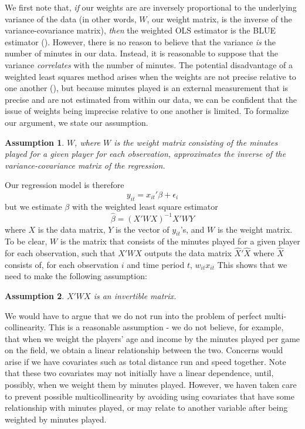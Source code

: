 \documentclass[12pt]{article}
\newtheorem{assumption}{Assumption}
\begin{document}
	We first note that, \emph{if} our weights are are inversely proportional to the underlying variance of the data (in other words, $W$, our weight matrix, is the inverse of the variance-covariance matrix), \emph{then} the weighted OLS estimator is the BLUE estimator (\cite{aitken_iv.least_1936}). However, there is no reason to believe that the variance \emph{is} the number of minutes in our data. Instead, it is reasonable to suppose that the variance \emph{correlates} with the number of minutes. The potential disadvantage of a weighted least squares method arises when the weights are not precise relative to one another (\cite{carroll_transformation_1988}), but because minutes played is an external measurement that is precise and are not estimated from within our data, we can be confident that the issue of weights being imprecise relative to one another is limited. To formalize our argument, we state our assumption.
	
	\begin{assumption}
		$W$, where $W$ is the weight matrix consisting of the minutes played for a given player for each observation, approximates the inverse of the variance-covariance matrix of the regression.
	\end{assumption}
	
	Our regression model is therefore \[
	y_{it} = x_{it}'\beta + \epsilon_i
	\] but we estimate $\beta$ with the weighted least square estimator \[
	\hat{\beta} = \left(X'WX\right)^{-1}X'WY
	\] where $X$ is the data matrix, $Y$ is the vector of $y_{it}$'s, and $W$ is the weight matrix. To be clear, $W$ is the matrix that consists of the minutes played for a given player for each observation, such that $X'WX$ outputs the data matrix $\hat{X}'\hat{X}$ where $\hat{X}$ consists of, for each observation $i$ and time period $t$, $w_{it}x_{it}$ This shows that we need to make the following assumption:
	
	\begin{assumption}
		$X'WX$ is an invertible matrix.
	\end{assumption}
	
	We would have to argue that we do not run into the problem of perfect multi-collinearity. This is a reasonable assumption - we do not believe, for example, that when we weight the players' age and income by the minutes played per game on the field, we obtain a linear relationship between the two. Concerns would arise if we have covariates such as total distance run and speed together. Note that these two covariates may not initially have a linear dependence, until, possibly, when we weight them by minutes played. However, we haven taken care to prevent possible multicollinearity by avoiding using covariates that have some relationship with minutes played, or may relate to another variable after being weighted by minutes played.
	
\end{document}
